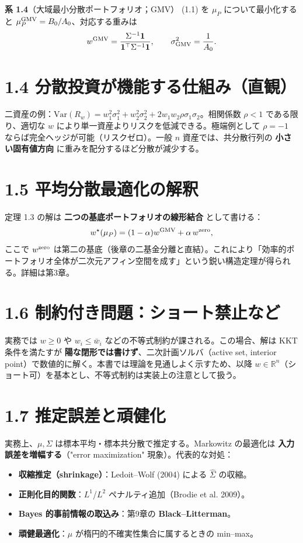\documentclass[11pt,a4paper]{report}
\begin{document}
\textbf{系 1.4}（大域最小分散ポートフォリオ；GMV） (1.1) を $\mu_P$ について最小化すると $\mu_P^{\rm GMV} = B_0 / A_0$、対応する重みは \[ w^{\rm GMV} = \frac{\Sigma^{-1} \mathbf{1}}{\mathbf{1}^\top \Sigma^{-1} \mathbf{1}}, \qquad \sigma_{\rm GMV}^2 = \frac{1}{A_0}. \]

\section{1.4 分散投資が機能する仕組み（直観）}

二資産の例：$\mathrm{Var}(R_w) = w_1^2 \sigma_1^2 + w_2^2 \sigma_2^2 + 2 w_1 w_2 \rho \sigma_1 \sigma_2$。相関係数 $\rho < 1$ である限り、適切な $w$ により単一資産よりリスクを低減できる。極端例として $\rho = -1$ ならば完全ヘッジが可能（リスクゼロ）。一般 $n$ 資産では、共分散行列の \textbf{小さい固有値方向} に重みを配分するほど分散が減少する。

\section{1.5 平均分散最適化の解釈}

定理 1.3 の解は \textbf{二つの基底ポートフォリオの線形結合} として書ける： \[ w^\star(\mu_P) = (1 - \alpha) w^{\rm GMV} + \alpha\, w^{\rm zero}, \] ここで $w^{\rm zero}$ は第二の基底（後章の二基金分離と直結）。これにより「効率的ポートフォリオ全体が二次元アフィン空間を成す」という鋭い構造定理が得られる。詳細は第3章。

\section{1.6 制約付き問題：ショート禁止など}

実務では $w \ge 0$ や $w_i \le \bar w_i$ などの不等式制約が課される。この場合、解は KKT 条件を満たすが \textbf{陽な閉形では書けず}、二次計画ソルバ（active set, interior point）で数値的に解く。本書では理論を見通しよく示すため、以降 $w \in \mathbb{R}^n$（ショート可）を基本とし、不等式制約は実装上の注意として扱う。

\section{1.7 推定誤差と頑健化}

実務上、$\mu, \Sigma$ は標本平均・標本共分散で推定する。Markowitz の最適化は \textbf{入力誤差を増幅する}（"error maximization" 現象）。代表的な対処：

\begin{itemize}
\item \textbf{収縮推定（shrinkage）}：Ledoit–Wolf (2004) による $\hat\Sigma$ の収縮。
\item \textbf{正則化目的関数}：$L^1$/$L^2$ ペナルティ追加（Brodie et al. 2009）。
\item \textbf{Bayes 的事前情報の取込み}：第9章の \textbf{Black–Litterman}。
\item \textbf{頑健最適化}：$\mu$ が楕円的不確実性集合に属するときの min–max。
\end{itemize}
\end{document}
